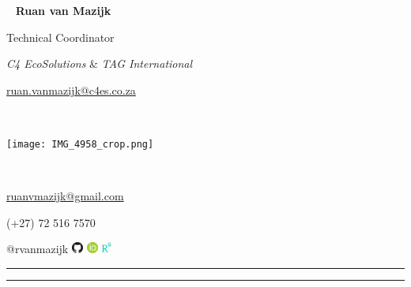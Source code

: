 \begin{multicols}{3}
  \
  \vfill
  \raggedleft
    {\huge \textbf{Ruan van Mazijk}} \par
    {\Large Technical Coordinator} \par
    \textit{C4 EcoSolutions} \& \textit{TAG International} \par
    \href{mailto:ruan.vanmazijk@c4es.co.za}{ruan.vanmazijk@c4es.co.za} \par
  \vfill
  \
  \begin{center}
    \texttt{[image: IMG\_4958\_crop.png]}
  \end{center}
  \columnbreak
  \par \
  \vfill
  \raggedright
    {\small \href{mailto:ruanvmazijk@gmail.com}{ruanvmazijk@gmail.com}} \par
    {\small (+27) 72 516 7570} \par
    {\small @rvanmazijk}
      \href{https://github.com/rvanmazijk}
           {\includegraphics[width=1em]{logos/GitHub.png}}
      \href{https://orcid.org/0000-0003-2659-6909}
           {\includegraphics[width=1em]{logos/ORCID.png}}
      \href{https://www.researchgate.net/profile/Ruan-Van-Mazijk}
           {\includegraphics[width=1em]{logos/ResearchGate-white_crop.jpg}}
  \vfill
\end{multicols}

\hrule \vskip2pt \hrule

